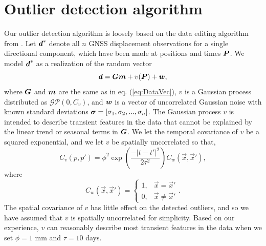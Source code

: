 \documentclass[extra,mreferee]{gji}
\begin{document}
\appendix

\section{Outlier detection algorithm}
Our outlier detection algorithm is loosely based on the data editing algorithm from \citet{Acheson1975}. Let $\mitbf{d}^*$ denote all $n$ GNSS displacement observations for a single directional component, which have been made at positions and times $\mitbf{P}$.  We model $\mitbf{d}^*$ as a realization of the random vector 
\begin{equation}\label{eq:OutlierDataVec}
\mitbf{d} = \mitbf{G}\mitbf{m} + v(\mitbf{P}) + \mitbf{w},
\end{equation}
where $\mitbf{G}$ and $\mitbf{m}$ are the same as in eq. (\ref{eq:DataVec}), $v$ is a Gaussian process distributed as $\mathcal{GP}(0,C_v)$, and $\mitbf{w}$ is a vector of uncorrelated Gaussian noise with known standard deviations $\mitbf{\sigma} = [\sigma_1, \sigma_2, ..., \sigma_n]$. The Gaussian process $v$ is intended to describe transient features in the data that cannot be explained by the linear trend or seasonal terms in $\mitbf{G}$. We let the temporal covariance of $v$ be a squared exponential, and we let $v$ be spatially uncorrelated so that,
\begin{equation}
C_v(p,p') = \phi^2\exp\left(\frac{-|t - t'|^2}{2\tau^2}\right) C_w(\vec{x},\vec{x}'),
\end{equation}
where 
\begin{equation}\label{eq:WhiteCov}
C_w(\vec{x},\vec{x}') = 
\begin{cases}
1, &\vec{x} = \vec{x}' \\
0, &\vec{x} \neq \vec{x}'
\end{cases}.
\end{equation}
The spatial covariance of $v$ has little effect on the detected outliers, and so we have assumed that $v$ is spatially uncorrelated for simplicity. Based on our experience, $v$ can reasonably describe most transient features in the data when we set $\phi = 1$ mm and $\tau = 10$ days. 
\end{document}
